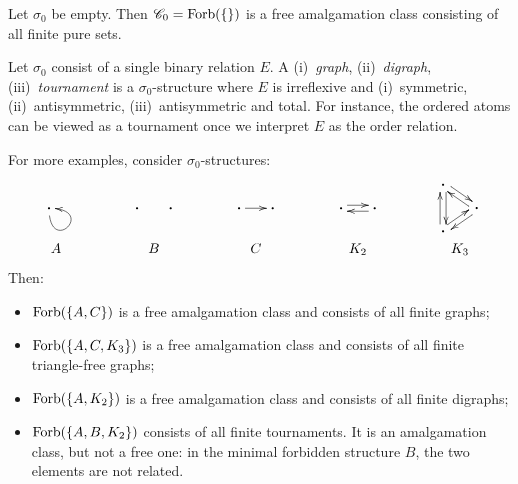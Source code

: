 \begin{example}\label{ex:free-amalg-equality}
    Let $\sigma_0$ be empty. 
    Then $\mathscr{C}_0 = \operatorname{Forb}(\{\})$ is a free amalgamation class consisting of all finite pure sets.
\lipicsEnd\end{example}

\begin{example}\label{ex:free-amalg-graphs}
    Let $\sigma_0$ consist of a single binary relation $E$. 
    A (i)~\emph{graph}, (ii)~\emph{digraph}, (iii)~\emph{tournament} is a $\sigma_0$-structure where $E$ is irreflexive and (i)~symmetric, (ii)~antisymmetric, (iii)~antisymmetric and total.
    For instance, the ordered atoms can be viewed as a tournament once we interpret $E$ as the order relation.

    For more examples, consider $\sigma_0$-structures:
    \[\arraycolsep=20pt\def\arraystretch{1.2}
    \begin{array}{ccccc}
    	\xymatrix@C=15pt{\bigdot\ar@(d,r)[]}
	&
	\quad\xymatrix@C=15pt{\bigdot&\bigdot}
	&
	\xymatrix@C=15pt{\bigdot\ar[r]&\bigdot}
	&
	\xymatrix@C=15pt{\bigdot\ar@<.5ex>[r]&\bigdot\ar@<.5ex>[l]}
	&
	\vcenter{\xymatrix@C=15pt@R=6pt{\bigdot\ar@<.5ex>[dd]\ar@<.5ex>[rd] \\ &\bigdot\ar@<.5ex>[lu]\ar@<.5ex>[ld] \\ \bigdot\ar@<.5ex>[uu]\ar@<.5ex>[ru]}} \\
	\quad A & \quad B & C & K_2 & K_3
	\end{array}
    \]
%    
    Then:
    \begin{itemize}
        \item 
        $\operatorname{Forb}(\{A, C\})$ is a free amalgamation class and consists of all finite graphs;
        
        \item
        $\operatorname{Forb}(\{A, C, K_3\})$ is a free amalgamation class and consists of all finite triangle-free graphs;
        
        \item 
        $\operatorname{Forb}(\{A, K_2\})$ is a free amalgamation class and consists of all finite digraphs;

        \item 
        $\operatorname{Forb}(\{A, B, K_2\})$ consists of all finite tournaments. 
        It is an amalgamation class,
        but not a free one: 
        in the minimal forbidden structure $B$, the two elements are not related.
        \lipicsEnd
    \end{itemize}
\end{example}

